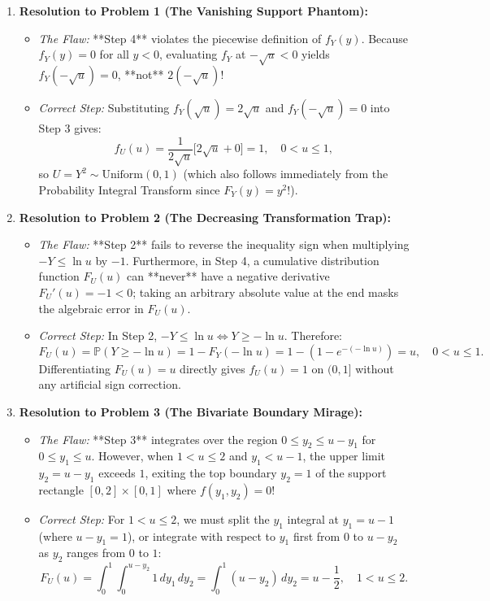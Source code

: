 \documentclass[11pt, letterpaper]{article}
\theoremstyle{definition}
\theoremstyle{remark}
\newcommand{\Prob}{\mathbb{P}}
\begin{document}
\begin{enumerate}
    \item \textbf{Resolution to Problem 1 (The Vanishing Support Phantom):}
    \begin{itemize}
        \item \textit{The Flaw:} **Step 4** violates the piecewise definition of $f_Y(y)$. Because $f_Y(y) = 0$ for all $y < 0$, evaluating $f_Y$ at $-\sqrt{u} < 0$ yields $f_Y(-\sqrt{u}) = 0$, **not** $2(-\sqrt{u})$!
        \item \textit{Correct Step:} Substituting $f_Y(\sqrt{u}) = 2\sqrt{u}$ and $f_Y(-\sqrt{u}) = 0$ into Step 3 gives:
        \[
            f_U(u) = \frac{1}{2\sqrt{u}}\big[ 2\sqrt{u} + 0 \big] = 1, \quad 0 < u \le 1,
        \]
        so $U = Y^2 \sim \text{Uniform}(0, 1)$ (which also follows immediately from the Probability Integral Transform since $F_Y(y) = y^2$!).
    \end{itemize}

    \item \textbf{Resolution to Problem 2 (The Decreasing Transformation Trap):}
    \begin{itemize}
        \item \textit{The Flaw:} **Step 2** fails to reverse the inequality sign when multiplying $-Y \le \ln u$ by $-1$. Furthermore, in Step 4, a cumulative distribution function $F_U(u)$ can **never** have a negative derivative $F_U'(u) = -1 < 0$; taking an arbitrary absolute value at the end masks the algebraic error in $F_U(u)$.
        \item \textit{Correct Step:} In Step 2, $-Y \le \ln u \iff Y \ge -\ln u$. Therefore:
        \[
            F_U(u) = \Prob(Y \ge -\ln u) = 1 - F_Y(-\ln u) = 1 - \left(1 - e^{-(-\ln u)}\right) = u, \quad 0 < u \le 1.
        \]
        Differentiating $F_U(u) = u$ directly gives $f_U(u) = 1$ on $(0, 1]$ without any artificial sign correction.
    \end{itemize}

    \item \textbf{Resolution to Problem 3 (The Bivariate Boundary Mirage):}
    \begin{itemize}
        \item \textit{The Flaw:} **Step 3** integrates over the region $0 \le y_2 \le u - y_1$ for $0 \le y_1 \le u$. However, when $1 < u \le 2$ and $y_1 < u - 1$, the upper limit $y_2 = u - y_1$ exceeds $1$, exiting the top boundary $y_2 = 1$ of the support rectangle $[0, 2] \times [0, 1]$ where $f(y_1, y_2) = 0$!
        \item \textit{Correct Step:} For $1 < u \le 2$, we must split the $y_1$ integral at $y_1 = u - 1$ (where $u - y_1 = 1$), or integrate with respect to $y_1$ first from $0$ to $u - y_2$ as $y_2$ ranges from $0$ to $1$:
        \[
            F_U(u) = \int_{0}^{1} \int_{0}^{u - y_2} 1\,dy_1\,dy_2 = \int_{0}^{1} (u - y_2)\,dy_2 = u - \frac{1}{2}, \quad 1 < u \le 2.
        \]
    \end{itemize}


\end{enumerate}
\end{document}
